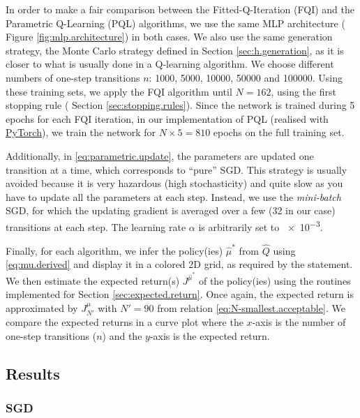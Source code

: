 \documentclass[a4paper, 12pt]{article}
\begin{document}
    In order to make a fair comparison between the Fitted-Q-Iteration (FQI) and the Parametric Q-Learning (PQL) algorithms, we use the same MLP architecture (\cf{} Figure \ref{fig:mlp.architecture}) in both cases. We also use the same generation strategy, \ie{} the Monte Carlo strategy defined in Section \ref{sec:h.generation}, as it is closer to what is usually done in a Q-learning algorithm. We choose different numbers\footnotemark{} of one-step transitions $n$: \num{1000}, \num{5000}, \num{10000}, \num{50000} and \num{100000}. Using these training sets, we apply the FQI algorithm until $N = 162$, \ie{} using the first stopping rule (\cf{} Section \ref{sec:stopping.rules}). Since the network is trained during 5 epochs for each FQI iteration, in our implementation of PQL (realised with \href{https://pytorch.org/}{PyTorch}), we train the network for $N \times 5 = 810$ epochs on the full training set.
    
    
    Additionally, in \eqref{eq:parametric.update}, the parameters are updated one transition at a time, which corresponds to \enquote{pure} SGD. This strategy is usually avoided because it is very hazardous (high stochasticity) and quite slow as you have to update all the parameters at each step. Instead, we use the \emph{mini-batch} SGD, for which the updating gradient is averaged over a few (32 in our case) transitions at each step. The learning rate $\alpha$ is arbitrarily set to \num{e-3}.
    
    Finally, for each algorithm, we infer the policy(ies) $\hat{\mu}^*$ from $\hat{Q}$ using \eqref{eq:mu.derived} and display it in a colored 2D grid, as required by the statement. We then estimate the expected return(s) $J^{\hat{\mu}^*}$ of the policy(ies) using the routines implemented for Section \ref{sec:expected.return}. Once again, the expected return is approximated by $J^\mu_{N'}$ with $N' = 90$ from relation \eqref{eq:N-smallest.acceptable}. We compare the expected returns in a curve plot where the $x$-axis is the number of one-step transitions ($n$) and the $y$-axis is the expected return.
    
    \subsection{Results}
    
    \subsubsection{SGD}
    
\end{document}
